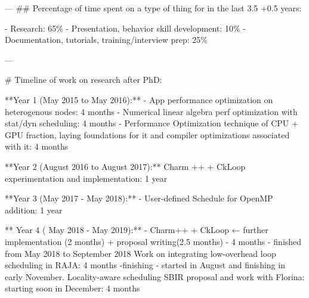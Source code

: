 ---
## Percentage of time spent on a type of thing for in the last 3.5 +0.5 years:

- Research: 65\%
- Presentation, behavior skill development: 10\%
- Documentation, tutorials, training/interview prep: 25\%

---

# Timeline of work on research after PhD:

**Year 1 (May 2015 to May 2016):**
- App performance optimization on heterogenous nodes: 4 months
- Numerical linear algebra perf optimization with stat/dyn scheduling: 4 months
- Performance Optimization technique of CPU + GPU fraction, laying foundations for it and compiler optimizations associated with it: 4 months

**Year 2 (August 2016 to August 2017):**
Charm ++  + CkLoop experimentation and implementation: 1 year

**Year 3 (May 2017 - May 2018):**
- User-defined Schedule for OpenMP addition: 1 year

** Year 4 ( May 2018 - May 2019):** 
-  Charm++ + CkLoop ← further implementation (2 months) + proposal writing(2.5 months) - 4 months  - finished from May 2018 to September 2018
Work on integrating low-overhead loop scheduling in RAJA: 4 months -finishing - started in August and finishing in early November.
Locality-aware scheduling SBIR proposal and work with Florina: starting soon in December: 4 months

